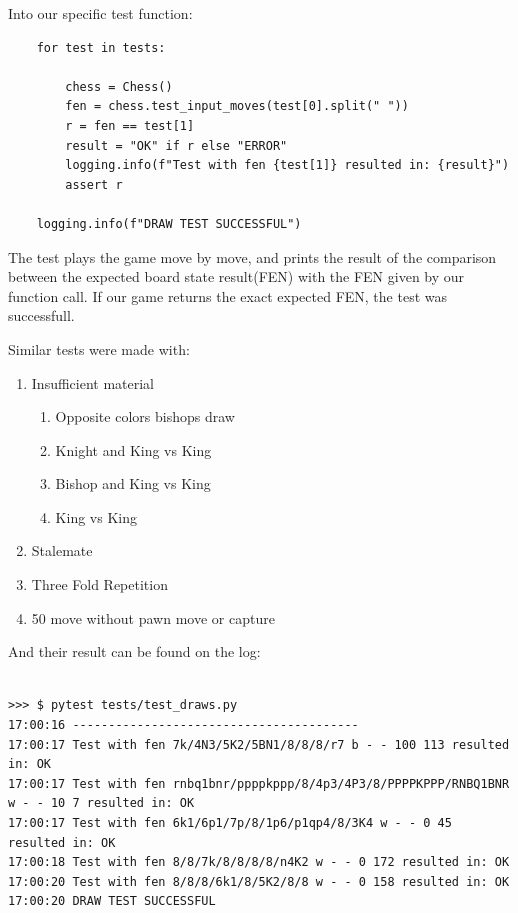 \documentclass[10pt]{article}
\begin{document}
Into our specific test function:

\begin{lstlisting}
    for test in tests:

        chess = Chess()
        fen = chess.test_input_moves(test[0].split(" "))
        r = fen == test[1]
        result = "OK" if r else "ERROR"
        logging.info(f"Test with fen {test[1]} resulted in: {result}")
        assert r

    logging.info(f"DRAW TEST SUCCESSFUL")

\end{lstlisting}

The test plays the game move by move, and prints the result of the comparison between the expected board state
result(FEN) with the FEN given by our function call. If our game returns the
exact expected FEN, the test was successfull.

Similar tests were made with:
\begin{enumerate}[label=\arabic*)]
\item Insufficient material
    \begin{enumerate}[label=\arabic{enumii}.\arabic*)]
    \item Opposite colors bishops draw
    \item Knight and King vs King
    \item Bishop and King vs King
    \item King vs King
    \end{enumerate}
    
    \item Stalemate 
    \item Three Fold Repetition
    \item 50 move without pawn move or capture
\end{enumerate}

And their result can be found on the log:
\begin{lstlisting}

>>> $ pytest tests/test_draws.py
17:00:16 ----------------------------------------
17:00:17 Test with fen 7k/4N3/5K2/5BN1/8/8/8/r7 b - - 100 113 resulted in: OK
17:00:17 Test with fen rnbq1bnr/ppppkppp/8/4p3/4P3/8/PPPPKPPP/RNBQ1BNR w - - 10 7 resulted in: OK
17:00:17 Test with fen 6k1/6p1/7p/8/1p6/p1qp4/8/3K4 w - - 0 45 resulted in: OK
17:00:18 Test with fen 8/8/7k/8/8/8/8/n4K2 w - - 0 172 resulted in: OK
17:00:20 Test with fen 8/8/8/6k1/8/5K2/8/8 w - - 0 158 resulted in: OK
17:00:20 DRAW TEST SUCCESSFUL

\end{lstlisting}
\end{document}
